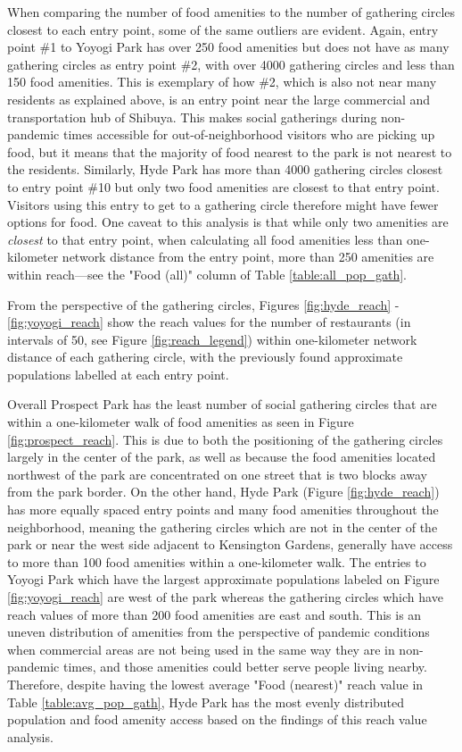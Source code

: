 \begin{multicols}{2}

When comparing the number of food amenities to the number of gathering circles closest to each entry point, some of the same outliers are evident. Again, entry point \#1 to Yoyogi Park has over 250 food amenities but does not have as many gathering circles as entry point \#2, with over 4000 gathering circles and less than 150 food amenities. This is exemplary of how \#2, which is also not near many residents as explained above, is an entry point near the large commercial and transportation hub of Shibuya. This makes social gatherings during non-pandemic times accessible for out-of-neighborhood visitors who are picking up food, but it means that the majority of food nearest to the park is not nearest to the residents. Similarly, Hyde Park has more than 4000 gathering circles closest to entry point \#10 but only two food amenities are closest to that entry point. Visitors using this entry to get to a gathering circle therefore might have fewer options for food. One caveat to this analysis is that while only two amenities are \textit{closest} to that entry point, when calculating all food amenities less than one-kilometer network distance from the entry point, more than 250 amenities are within reach---see the "Food (all)" column of Table \ref{table:all_pop_gath}. 

From the perspective of the gathering circles, Figures \ref{fig:hyde_reach} - \ref{fig:yoyogi_reach} show the reach values for the number of restaurants (in intervals of 50, see Figure \ref{fig:reach_legend}) within one-kilometer network distance of each gathering circle, with the previously found approximate populations labelled at each entry point. 

Overall Prospect Park has the least number of social gathering circles that are within a one-kilometer walk of food amenities as seen in Figure \ref{fig:prospect_reach}. This is due to both the positioning of the gathering circles largely in the center of the park, as well as because the food amenities located northwest of the park are concentrated on one street that is two blocks away from the park border. On the other hand, Hyde Park (Figure \ref{fig:hyde_reach}) has more equally spaced entry points and many food amenities throughout the neighborhood, meaning the gathering circles which are not in the center of the park or near the west side adjacent to Kensington Gardens, generally have access to more than 100 food amenities within a one-kilometer walk. The entries to Yoyogi Park which have the largest approximate populations labeled on Figure \ref{fig:yoyogi_reach} are west of the park whereas the gathering circles which have reach values of more than 200 food amenities are east and south. This is an uneven distribution of amenities from the perspective of pandemic conditions when commercial areas are not being used in the same way they are in non-pandemic times, and those amenities could better serve people living nearby. Therefore, despite having the lowest average "Food (nearest)" reach value in Table \ref{table:avg_pop_gath}, Hyde Park has the most evenly distributed population and food amenity access based on the findings of this reach value analysis.


\end{multicols}
